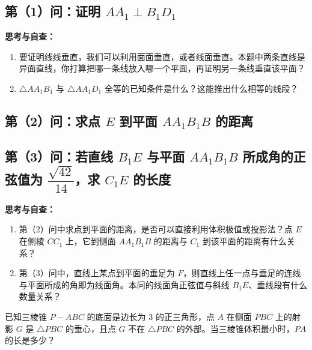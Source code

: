 \documentclass[11pt,a4paper]{ctexart}
\renewcommand{\studentthink}[1]{%
  \vspace{0.4em}
  {\small\textbf{思考与自查：}}
  \begin{enumerate}[label=\arabic*. , leftmargin=2em, itemsep=0.15em, topsep=0.2em]
    #1
  \end{enumerate}
}
\begin{document}
\subsection*{第（1）问：证明 $AA_1 \perp B_1D_1$}
\studentthink{
  \item 要证明线线垂直，我们可以利用面面垂直，或者线面垂直。本题中两条直线是异面直线，你打算把哪一条线放入哪一个平面，再证明另一条线垂直该平面？
  \item $\triangle AA_1B_1$ 与 $\triangle AA_1D_1$ 全等的已知条件是什么？这能推出什么相等的线段？
}

\newpage

\subsection*{第（2）问：求点 $E$ 到平面 $AA_1B_1B$ 的距离}

\subsection*{第（3）问：若直线 $B_1E$ 与平面 $AA_1B_1B$ 所成角的正弦值为 $\dfrac{\sqrt{42}}{14}$，求 $C_1E$ 的长度}
\studentthink{
  \item 第（2）问中求点到平面的距离，是否可以直接利用体积极值或投影法？点 $E$ 在侧棱 $CC_1$ 上，它到侧面 $AA_1B_1B$ 的距离与 $C_1$ 到该平面的距离有什么关系？
  \item 第（3）问中，直线上某点到平面的垂足为 $F$，则直线上任一点与垂足的连线与平面所成的角即为线面角。本问的线面角正弦值与斜线 $B_1E$、垂线段有什么数量关系？
}

\newpage

已知三棱锥 $P-ABC$ 的底面是边长为 3 的正三角形，点 $A$ 在侧面 $PBC$ 上的射影 $G$ 是 $\triangle PBC$ 的垂心，且点 $G$ 不在 $\triangle PBC$ 的外部。当三棱锥体积最小时，$PA$ 的长是多少？
\end{document}
